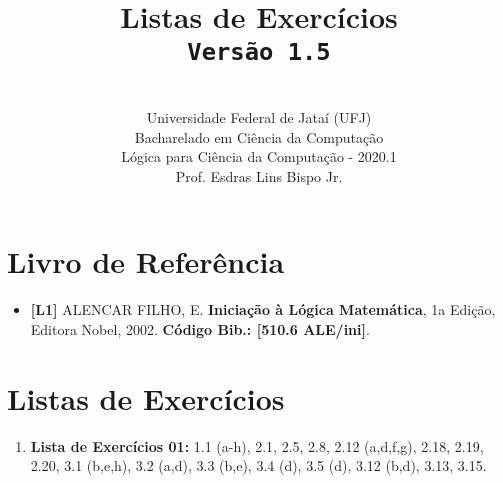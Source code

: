 \documentclass[12pt,a4paper,oneside]{article}
\author{\\Universidade Federal de Jataí (UFJ)\\Bacharelado em Ciência da Computação \\Lógica para Ciência da Computação - 2020.1 \\Prof. Esdras Lins Bispo Jr.}
\date{}
\title{
	\sc \huge Listas de Exercícios
	\\{\tt Versão 1.5}
}
\begin{document}
\maketitle

\section{Livro de Referência}
	\begin{itemize}
		\item  {\bf \color{blue} [L1]} ALENCAR FILHO, E. {\bf Iniciação à Lógica Matemática}, 1a Edição, Editora Nobel, 2002. {\color{blue} \bf Código Bib.: [510.6 ALE/ini]}.
	\end{itemize}
	
\section{Listas de Exercícios}

\begin{enumerate}

	\subsection{Mini-Teste 1}
	\item[] {\bf Lista de Exercícios 01:} 1.1 (a-h), 2.1, 2.5, 2.8, 2.12 (a,d,f,g), 2.18, 2.19, 2.20, 3.1 (b,e,h), 3.2 (a,d), 3.3 (b,e), 3.4 (d), 3.5 (d), 3.12 (b,d), 3.13, 3.15.
	
	
\end{enumerate}
\end{document}
